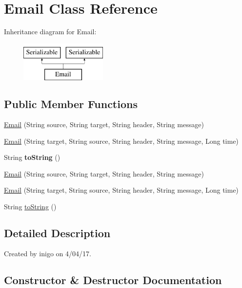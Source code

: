 \hypertarget{class_email}{}\section{Email Class Reference}
\label{class_email}
Inheritance diagram for Email\+:\begin{figure}[H]
\begin{center}
\leavevmode
\includegraphics[height=2.000000cm]{class_email}
\end{center}
\end{figure}
\subsection*{Public Member Functions}
\begin{DoxyCompactItemize}
\item 
\hyperlink{class_email_aeb3e50d5f8a615a8320d14f0b391f325}{Email} (String source, String target, String header, String message)
\item 
\hyperlink{class_email_ac5e2d95c5f91c21ecba14dc3db380f6a}{Email} (String target, String source, String header, String message, Long time)
\item 
\mbox{\label{class_email_ada3a942a6a2471322bf1fa6ab44e0dbd}} 
String {\bfseries to\+String} ()
\item 
\hyperlink{class_email_aeb3e50d5f8a615a8320d14f0b391f325}{Email} (String source, String target, String header, String message)
\item 
\hyperlink{class_email_ac5e2d95c5f91c21ecba14dc3db380f6a}{Email} (String target, String source, String header, String message, Long time)
\item 
String \hyperlink{class_email_ada3a942a6a2471322bf1fa6ab44e0dbd}{to\+String} ()
\end{DoxyCompactItemize}


\subsection{Detailed Description}
Created by inigo on 4/04/17. 

\subsection{Constructor \& Destructor Documentation}
\mbox{\label{class_email_aeb3e50d5f8a615a8320d14f0b391f325}} 
